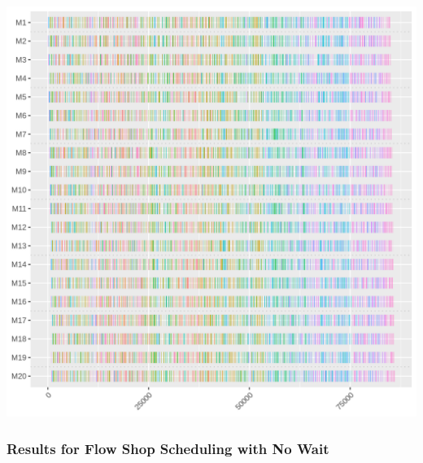 \documentclass[12pt]{article}
\begin{document}
				\includegraphics[width=\linewidth]{20_500_GC_3.png}
				
				\subsubsection{Results for Flow Shop Scheduling with No Wait}
					\newpage
				
\end{document}
